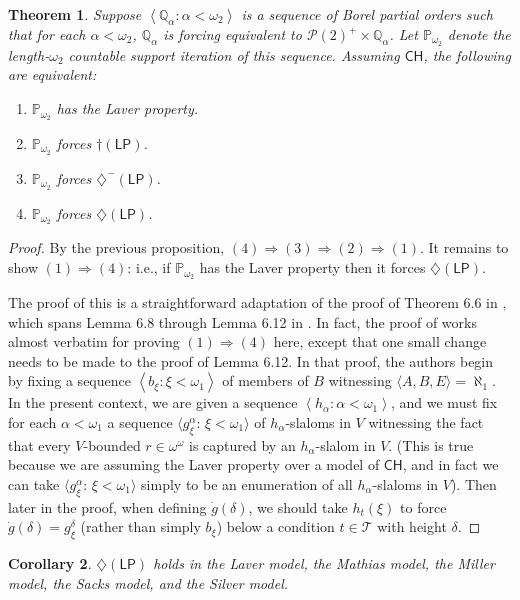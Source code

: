 \documentclass[11pt,leqno]{amsart}
\newtheorem{theorem}{Theorem}[section]
\newtheorem{corollary}[theorem]{Corollary}
\theoremstyle{definition}
\theoremstyle{remark}
\newcommand{\Q}{\mathbb{Q}}
\renewcommand{\P}{\mathcal{P}}
\newcommand{\brackets}[1]{\left\langle #1 \right\rangle}
\newcommand{\seq}[2]{\brackets{#1 \colon #2}}
\newcommand{\<}{\langle}
\renewcommand{\>}{\rangle}
\renewcommand{\a}{\alpha}
\newcommand{\dlt}{\delta}
\newcommand{\w}{\omega}
\newcommand{\0}{\emptyset}
\newcommand{\PP}{\mathbb{P}}
\newcommand{\1}{1\hspace{-1.75mm}1}
\newcommand{\ch}{\ensuremath{\mathsf{CH}}\xspace}
\newcommand{\dLP}{\diamondsuit(\mathsf{LP})}
\newcommand{\dLPm}{\diamondsuit^-(\mathsf{LP})}
\newcommand{\cLP}{\dagger(\mathsf{LP})}
\begin{document}
\begin{theorem}\label{thm:MHD}
Suppose $\seq{\Q_\a}{\a < \w_2}$ is a sequence of Borel partial orders such that for each $\a < \w_2$, $\Q_\a$ is forcing equivalent to $\P(2)^+ \times \Q_\a$. 
Let $\PP_{\w_2}$ denote the length-$\w_2$ countable support iteration of this sequence. 
Assuming \ch, the following are equivalent:
\begin{enumerate}
\item $\PP_{\w_2}$ has the Laver property.
\item $\PP_{\w_2}$ forces $\cLP$. 
\item $\PP_{\w_2}$ forces $\dLPm$. 
\item $\PP_{\w_2}$ forces $\dLP$. 
\end{enumerate} 
\end{theorem}
\begin{proof}
By the previous proposition, $(4) \Rightarrow (3) \Rightarrow (2) \Rightarrow (1)$. It remains to show $(1) \Rightarrow (4)$: i.e., if $\PP_{\w_2}$ has the Laver property then it forces $\dLP$. 

The proof of this is a straightforward adaptation of the proof of Theorem 6.6 in \cite{MHD}, which spans Lemma 6.8 through Lemma 6.12 in \cite{MHD}. 
In fact, the proof of \cite[Theorem 6.6]{MHD} works almost verbatim for proving $(1) \Rightarrow (4)$ here, except that one small change needs to be made to the proof of Lemma 6.12. 
In that proof, the authors begin by fixing a sequence $\seq{b_\xi}{\xi < \w_1}$ of members of $B$ witnessing $\<A,B,E\> = \aleph_1$. 
In the present context, we are given a sequence $\seq{h_\a}{\a < \w_1}$, and we must fix for each $\a < \w_1$ a sequence $\< g_\xi^\a :\, \xi < \w_1 \>$ of $h_\a$-slaloms in $V$ witnessing the fact that every $V$-bounded $r \in \w^\w$ is captured by an $h_\a$-slalom in $V$. (This is true because we are assuming the Laver property over a model of \ch, and in fact we can take $\< g_\xi^\a :\, \xi < \w_1 \>$ simply to be an enumeration of all $h_\a$-slaloms in $V$). Then later in the proof, when defining $\dot g(\dlt)$, we should take $h_t(\xi)$ to force $\dot g(\dlt) = g_\xi^\dlt$ (rather than simply $b_\xi$) below a condition $t \in \mathcal T$ with height $\dlt$. 
\end{proof}

\begin{corollary}\label{cor:list}
$\dLP$ holds in the Laver model, the Mathias model, the Miller model, the Sacks model, and the Silver model. 
\end{corollary}
\end{document}
